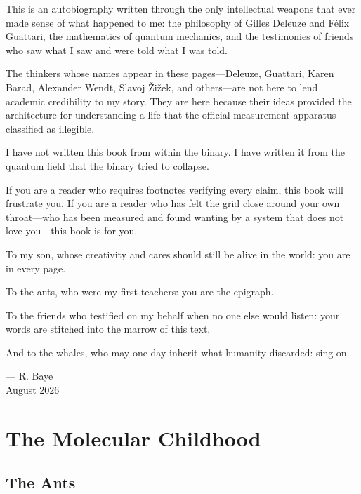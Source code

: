\documentclass[11pt,openany]{book}
\begin{document}
This is an autobiography written through the only intellectual weapons that ever made sense of what happened to me: the philosophy of Gilles Deleuze and F\'elix Guattari, the mathematics of quantum mechanics, and the testimonies of friends who saw what I saw and were told what I was told.

The thinkers whose names appear in these pages---Deleuze, Guattari, Karen Barad, Alexander Wendt, Slavoj \v{Z}i\v{z}ek, and others---are not here to lend academic credibility to my story. They are here because their ideas provided the architecture for understanding a life that the official measurement apparatus classified as illegible.

I have not written this book from within the binary. I have written it from the quantum field that the binary tried to collapse.

If you are a reader who requires footnotes verifying every claim, this book will frustrate you. If you are a reader who has felt the grid close around your own throat---who has been measured and found wanting by a system that does not love you---this book is for you.

To my son, whose creativity and cares should still be alive in the world: you are in every page.

To the ants, who were my first teachers: you are the epigraph.

To the friends who testified on my behalf when no one else would listen: your words are stitched into the marrow of this text.

And to the whales, who may one day inherit what humanity discarded: sing on.

\vspace{2ex}
\begin{flushright}
--- R. Baye\\
August 2026
\end{flushright}

\mainmatter


\part{The Molecular Childhood}

\chapter{The Ants}
\end{document}
